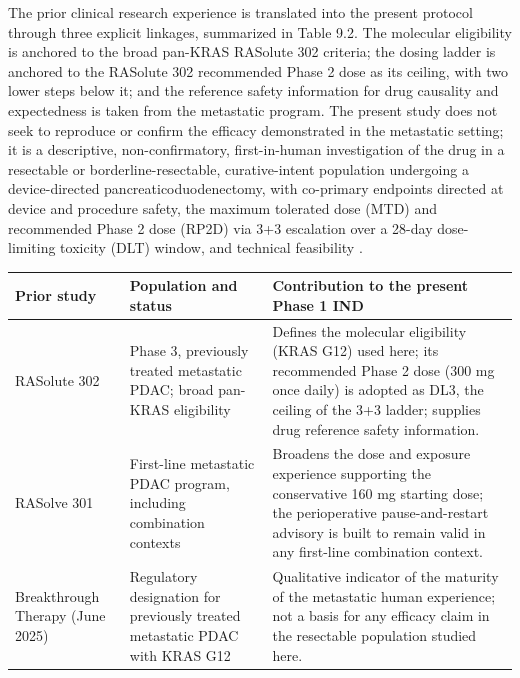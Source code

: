 The prior clinical research experience is translated into the present protocol
through three explicit linkages, summarized in Table 9.2. The molecular
eligibility is anchored to the broad pan-KRAS RASolute 302 criteria; the dosing
ladder is anchored to the RASolute 302 recommended Phase 2 dose as its ceiling,
with two lower steps below it; and the reference safety information for drug
causality and expectedness is taken from the metastatic program. The present study
does not seek to reproduce or confirm the efficacy demonstrated in the metastatic
setting; it is a descriptive, non-confirmatory, first-in-human investigation of the
drug in a resectable or borderline-resectable, curative-intent population
undergoing a device-directed pancreaticoduodenectomy, with co-primary endpoints
directed at device and procedure safety, the maximum tolerated dose (MTD) and
recommended Phase 2 dose (RP2D) via 3+3 escalation over a 28-day dose-limiting
toxicity (DLT) window, and technical feasibility \cite{phase1guidance, daraxwhipple}.

\noindent\begin{tabularx}{\textwidth}{L{3.6cm} L{4.6cm} Y}
\toprule
\textbf{Prior study} & \textbf{Population and status} & \textbf{Contribution to the present Phase 1 IND} \\
\midrule
RASolute 302 & Phase 3, previously treated metastatic PDAC; broad pan-KRAS eligibility & Defines the molecular eligibility (KRAS G12) used here; its recommended Phase 2 dose (300 mg once daily) is adopted as DL3, the ceiling of the 3+3 ladder; supplies drug reference safety information. \\
RASolve 301 & First-line metastatic PDAC program, including combination contexts & Broadens the dose and exposure experience supporting the conservative 160 mg starting dose; the perioperative pause-and-restart advisory is built to remain valid in any first-line combination context. \\
Breakthrough Therapy (June 2025) & Regulatory designation for previously treated metastatic PDAC with KRAS G12 & Qualitative indicator of the maturity of the metastatic human experience; not a basis for any efficacy claim in the resectable population studied here. \\
\bottomrule
\end{tabularx}
\vspace*{-0.265cm}


